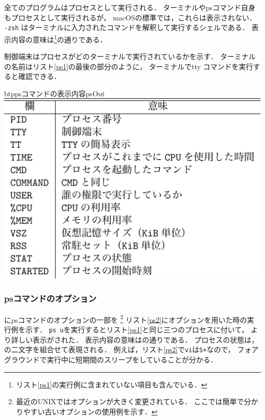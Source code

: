 

全てのプログラムはプロセスとして実行される．
ターミナルやpsコマンド自身もプロセスとして実行されるが，
macOSの標準では，これらは表示されない．
\texttt{-zsh} はターミナルに入力されたコマンドを解釈して実行するシェルである．
表示内容の意味は\footnote{
リスト\ref{ps1}の実行例に含まれていない項目も含んでいる．}の通りである．

制御端末はプロセスがどのターミナルで実行されているかを示す．
ターミナルの名前はリスト\ref{ps1}の最後の部分のように，
ターミナルでtty コマンドを実行すると確認できる．

%

\begin{mytable}{btp}{psコマンドの表示内容}{psOut}
  \includegraphics[scale=1.0]{Tbl/psOut.pdf}
\end{mytable}

\subsubsection{psコマンドのオプション}
にpsコマンドのオプションの一部を
\footnote{
最近のUNIXではオプションが大きく変更されている．
ここでは簡単で分かりやすい古いオプションの使用例を示す．
}
リスト\ref{ps2}にオプションを用いた時の実行例を示す．
\texttt{ps u}を実行するとリスト\ref{ps1}と同じ三つのプロセスに付いて，
より詳しい表示がされた．
表示内容の意味はの通りである．
プロセスの状態は，の二文字を組合せて表現される．
例えば，リスト\ref{ps2}で\texttt{vi}は\texttt{S+}なので，
フォアグラウンドで実行中に短期間のスリープをしていることが分かる．

